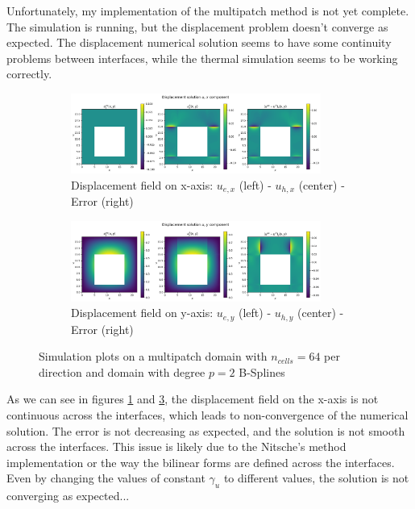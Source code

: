 \documentclass[a4paper,12pt,twoside]{report}
\begin{document}
Unfortunately, my implementation of the multipatch method is not yet complete. The simulation is running, but the displacement problem doesn't converge as expected. The displacement numerical solution seems to have some continuity problems between interfaces, while the thermal simulation seems to be working correctly.

\begin{figure}  \ContinuedFloat
	\centering
	\begin{subfigure}[b]{\textwidth}
		\centering
		\includegraphics[width=0.9\textwidth]{figures/figures_multipatch/ux.png}
		\caption{Displacement field on x-axis: $u_{e,x}$ (left) - $u_{h,x}$ (center) - Error (right)}
		\label{fig:ux_multipatch}
	\end{subfigure}
	\begin{subfigure}[b]{\textwidth}
		\centering
		\includegraphics[width=0.9\textwidth]{figures/figures_multipatch/uy.png}
		\caption{Displacement field on y-axis: $u_{e,y}$ (left) - $u_{h,y}$ (center) - Error (right)}
		\label{fig:uy_multipatch}
	\end{subfigure}
	\caption{Simulation plots on a multipatch domain with $n_{cells} = 64$ per direction and domain with degree $p = 2$ B-Splines}
\end{figure}

As we can see in figures \ref{fig:ux_multipatch} and \ref{fig:uy_multipatch}, the displacement field on the x-axis is not continuous across the interfaces, which leads to non-convergence of the numerical solution. The error is not decreasing as expected, and the solution is not smooth across the interfaces. This issue is likely due to the Nitsche's method implementation or the way the bilinear forms are defined across the interfaces. Even by changing the values of constant $\gamma_u$ to different values, the solution is not converging as expected...
\end{document}
